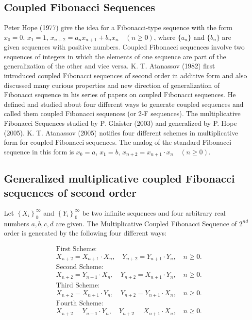 \subsection*{Coupled Fibonacci Sequences}
Peter Hope (1977) give the idea for a Fibonacci-type sequence with the form $x_0 = 0$, $x_1 = 1$, $x_{n+2} = a_{n}x_{n+1}+b_{n}x_{n} \quad(n\geq 0)$, where $\lbrace a_n\rbrace $ and $\lbrace b_n\rbrace $ are given sequences with positive numbers. Coupled Fibonacci sequences involve two sequences of integers in which the elements of one sequence are part of the generalization of the other and vice versa. K. T. Atanassov (1982) first introduced coupled Fibonacci sequences of second order in additive form and also discussed many curious properties and new direction of generalization of Fibonacci sequence in his series of papers on coupled Fibonacci sequences. He defined and studied about four different ways to generate coupled sequences and called them coupled Fibonacci sequences (or 2-F sequences). The multiplicative Fibonacci Sequences studied by P. Glaister (2003) and generalized by P. Hope (2005). K. T. Atanassov (2005) notifies four different schemes in multiplicative form for coupled Fibonacci sequences. The analog of the standard Fibonacci sequence in this form is
$x_0 = a$, $x_1 = b$, $x_{n+2} = x_{n+1}\cdot x_{n} \quad(n\geq 0)$.
\subsection*{Generalized multiplicative coupled Fibonacci sequences of second order}
\begin{definition}
Let $\left\{X_{i}\right\}_{0}^{\infty}$ and $\left\{Y_{i}\right\}_{0}^{\infty}$ be two infinite sequences and four arbitrary real numbers $a,b,c,d$ are given. The Multiplicative Coupled Fibonacci  Sequence of $2^{nd}$  order is generated by the following four different ways:
\end{definition}
	\begin{align*}
	 &\text{First Scheme:}\\
	&X_{n+2}=X_{n+1}\cdot  X_{n}, \quad	Y_{n+2}=Y_{n+1}\cdot Y_{n},\quad \text{$n\geq 0$}.\\
	&  \text{Second Scheme:}\\
	&X_{n+2}=Y_{n+1}\cdot X_{n}, \quad
	Y_{n+2}=X_{n+1}\cdot Y_{n},\quad \text{$n\geq 0$}.\\
	 &\text{Third Scheme:}\\
	&X_{n+2}=X_{n+1}\cdot Y_{n}, \quad
	Y_{n+2}=Y_{n+1}\cdot X_{n},\quad \text{$n\geq 0$}.\\
 &\text{Fourth Scheme:}\\
	&X_{n+2}=Y_{n+1}\cdot Y_{n}, \quad
	Y_{n+2}=X_{n+1}\cdot X_{n},\quad \text{$n\geq 0$}.
	\end{align*}
